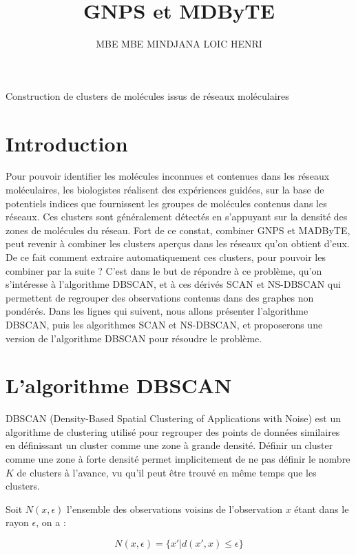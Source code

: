 \documentclass[12pt, french, latin.medieval, a4paper]{report}
\author{MBE MBE MINDJANA LOIC HENRI}
\title{GNPS et MDByTE}
\begin{document}
    
    \pagecouverture
    {Construction de clusters de molécules issus de réseaux moléculaires}
    {}

    \tableofcontents
    \vspace{20cm}
    
    \section{Introduction}
    Pour pouvoir identifier les molécules inconnues et contenues dans les réseaux moléculaires, les biologistes réalisent des expériences guidées, sur la base de potentiels indices que fournissent les groupes de molécules contenus dans les réseaux.
    Ces clusters sont généralement détectés en s’appuyant sur la densité des zones de molécules du réseau.
    Fort de ce constat, combiner GNPS et MADByTE, peut revenir à combiner les clusters aperçus dans les réseaux qu'on obtient d'eux.
    De ce fait comment extraire automatiquement ces clusters, pour pouvoir les combiner par la suite ?
    C'est dans le but de répondre à ce problème, qu'on s'intéresse à l'algorithme DBSCAN, et à ces dérivés SCAN et NS-DBSCAN qui permettent de regrouper des observations contenus dans des graphes non pondérés.
    Dans les lignes qui suivent, nous allons présenter l'algorithme DBSCAN, puis les algorithmes SCAN et NS-DBSCAN, et proposerons une version de l'algorithme DBSCAN pour résoudre le problème.
    
    
    \section{L'algorithme DBSCAN}
    	DBSCAN (Density-Based Spatial Clustering of Applications with Noise) \cite{khan2014dbscan} est un algorithme de clustering utilisé pour regrouper des points de données similaires en définissant un cluster comme une zone à grande densité.
   	 Définir un cluster comme une zone à forte densité permet implicitement de ne pas définir le nombre $K$ de clusters à l'avance, vu qu'il peut être trouvé en même temps que les clusters.
   	 
    	Soit $N(x, \epsilon)$ l'ensemble des observations voisins de l'observation $x$ étant dans le rayon $\epsilon$, on a :
   	 
    	\begin{equation}
        	N(x, \epsilon) = \{ x' | d(x', x) \leq \epsilon\}
    	\end{equation}
   	 
\end{document}
